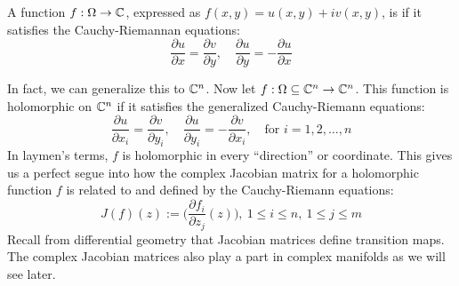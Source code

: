 \begin{definition}\label{3.2}
    A function $f: \Omega \to \mathbb{C}$, expressed as $f(x,y) = u(x,y) + iv(x,y)$,
    is  if it satisfies the Cauchy-Riemannan
    equations:
    \begin{equation*}
        \dfrac{\partial u}{\partial x} = \dfrac{\partial v}{\partial y}, \quad
        \dfrac{\partial u}{\partial y} = - \dfrac{\partial u}{\partial x}
    \end{equation*}
\end{definition}
In fact, we can generalize this to $\mathbb{C}^n$. Now let $f: \Omega \subseteq \mathbb{C}^n \to
\mathbb{C}^n$. This function is holomorphic on $\mathbb{C}^n$ if it satisfies the generalized 
Cauchy-Riemann equations:
\begin{equation*}
    \dfrac{\partial u}{\partial x_i} = \dfrac{\partial v}{\partial y_i}, \quad 
    \dfrac{\partial u}{\partial y_i} = - \dfrac{\partial v}{\partial x_i},\quad
    \text{for } i = 1, 2, \hdots , n
\end{equation*} 
In laymen's terms, $f$ is holomorphic in every ``direction'' or coordinate. This
gives us a perfect segue into how the complex Jacobian matrix for a holomorphic function
$f$ is related to and defined by the Cauchy-Riemann equations:
\begin{equation*}
    J(f)(z):= \bigg(\dfrac{\partial f_i}{\partial z_j}(z)\bigg), \ 1 \leq i \leq n, \
    1 \leq j \leq m
\end{equation*}
Recall from differential geometry that Jacobian matrices define transition maps.
The complex Jacobian matrices also play a part in complex manifolds as we will see
later.
